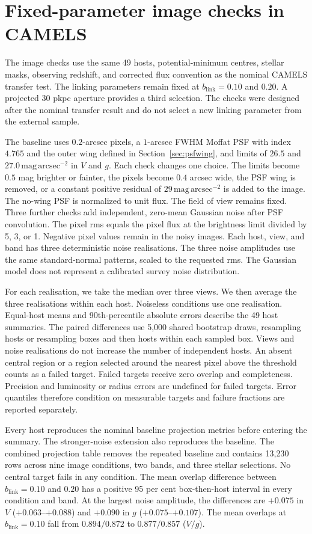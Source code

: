 \documentclass[usenatbib]{mnras}
\begin{document}
\section{Fixed-parameter image checks in CAMELS}
\label{sec:camelsimage}
The image checks use the same 49 hosts, potential-minimum centres,
stellar masks, observing redshift, and corrected flux convention as the
nominal CAMELS transfer test. The linking parameters remain fixed at
$b_{\mathrm{link}}=0.10$ and $0.20$. A projected 30 pkpc aperture provides a third
selection. The checks were designed after the nominal transfer result
and do not select a new linking parameter from the external sample.

The baseline uses $0.2$-arcsec pixels, a $1$-arcsec FWHM Moffat PSF
with index $4.765$ and the outer wing defined in
Section~\ref{sec:psfwing}, and limits
of $26.5$ and $27.0\,\mathrm{mag\,arcsec}^{-2}$ in $V$ and $g$.
Each check changes one choice. The limits become $0.5$ mag brighter
or fainter, the pixels become $0.4$ arcsec wide, the PSF wing is
removed, or a constant positive residual of
$29\,\mathrm{mag\,arcsec}^{-2}$ is added to the image. The no-wing
PSF is normalized to unit flux. The field of view remains fixed.
Three further checks add independent, zero-mean Gaussian noise after
PSF convolution. The pixel rms equals the pixel flux at the brightness
limit divided by 5, 3, or 1. Negative pixel values remain in the
noisy images. Each host, view, and band has three deterministic noise
realisations. The three noise amplitudes use the same standard-normal
patterns, scaled to the requested rms. The Gaussian model does not
represent a calibrated survey noise distribution.

For each realisation, we take the median over three views. We then
average the three realisations within each host. Noiseless conditions
use one realisation. Equal-host means and 90th-percentile absolute
errors describe the 49 host summaries. The paired differences use
5,000 shared bootstrap draws, resampling hosts or resampling boxes
and then hosts within each sampled box. Views and noise realisations
do not increase the number of independent hosts. An absent central region or a region selected around the nearest pixel
above the threshold counts as a failed target. Failed targets receive zero overlap and
completeness. Precision and luminosity or radius errors are undefined
for failed targets. Error quantiles therefore condition on measurable
targets and failure fractions are reported separately.

Every host reproduces the nominal baseline projection metrics before
entering the summary. The stronger-noise extension also reproduces the
baseline. The combined projection table removes the repeated baseline
and contains 13,230 rows across nine image conditions, two bands, and
three stellar selections. No central target fails in any condition.
The mean overlap difference between $b_{\mathrm{link}}=0.10$ and $0.20$ has a positive
95 per cent box-then-host interval in every condition and band. At the
largest noise amplitude, the differences are $+0.075$ in $V$
($+0.063$--$+0.088$) and $+0.090$ in $g$
($+0.075$--$+0.107$). The mean overlaps at $b_{\mathrm{link}}=0.10$ fall from
$0.894/0.872$ to $0.877/0.857$ ($V/g$).
\end{document}
